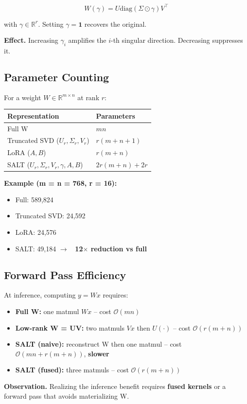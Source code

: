 \[
W(\gamma) = U \text{diag}(\Sigma \odot \gamma) V^\top
\tag{3.4}
\]

with $\gamma \in \mathbb{R}^r$. Setting $\gamma = \mathbf{1}$ recovers the 
original.

\textbf{Effect.} Increasing $\gamma_i$ amplifies the $i$-th singular direction. 
Decreasing suppresses it.

\subsection{Parameter Counting}

For a weight $W \in \mathbb{R}^{m \times n}$ at rank $r$:

\begin{table}[H]
\centering
\small
\begin{tabular}{ll}
\toprule
\textbf{Representation} & \textbf{Parameters} \\
\midrule
Full W & $mn$ \\
Truncated SVD ($U_r, \Sigma_r, V_r$) & $r(m + n + 1)$ \\
LoRA ($A, B$) & $r(m + n)$ \\
SALT ($U_r, \Sigma_r, V_r, \gamma, A, B$) & $2r(m + n) + 2r$ \\
\bottomrule
\end{tabular}
\end{table}

\textbf{Example (m = n = 768, r = 16):}

\begin{itemize}
\item Full: 589,824
\item Truncated SVD: 24,592
\item LoRA: 24,576
\item SALT: 49,184 $\to$ \textbf{~12$\times$ reduction vs full}

\end{itemize}
\subsection{Forward Pass Efficiency}

At inference, computing $y = Wx$ requires:

\begin{itemize}
\item \textbf{Full W:} one matmul $Wx$ -- cost $\mathcal{O}(mn)$
\item \textbf{Low-rank W = UV:} two matmuls $Vx$ then $U(\cdot)$ -- cost $\mathcal{O}(r(m+n))$
\item \textbf{SALT (naive):} reconstruct W then one matmul -- cost $\mathcal{O}(mn + r(m+n))$, \textbf{slower}
\item \textbf{SALT (fused):} three matmuls -- cost $\mathcal{O}(r(m+n))$

\end{itemize}
\textbf{Observation.} Realizing the inference benefit requires \textbf{fused kernels} 
or a forward pass that avoids materializing W.

